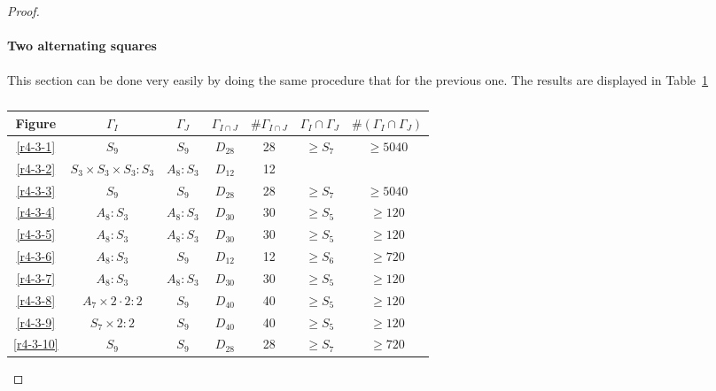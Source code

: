 \begin{proof}
  \paragraph{}
  \textbf{Two alternating squares}

  \paragraph{}
  This section can be done very easily by doing the same procedure that for the previous one. The results are displayed in Table~\ref{results-2-3}

  \begin{table}
    \centering
    \begin{tabular}{|c|c|c|c|c|c|c|}
      \hline
      Figure & $\Gamma_{I}$ & $\Gamma_{J}$ & $\Gamma_{I \cap J}$ & $\#\Gamma_{I \cap J}$ & $\Gamma_{I} \cap \Gamma_{J}$ & $\#(\Gamma_{I} \cap \Gamma_{J})$ \\ \hline

      \ref{r4-3-1} & $S_9$ & $S_9$ & $D_{28}$ & 28 & $\ge S_7$ & $\ge 5040$ \\ \hline
      \ref{r4-3-2} & $S_3 \times S_3 \times S_3:S_3$ & $A_8 : S_3$ & $D_{12}$ & 12 & & \\ \hline
      \ref{r4-3-3} & $S_9$ & $S_9$ & $D_{28}$ & 28 & $\ge S_7$ & $\ge 5040$ \\ \hline
      \ref{r4-3-4} & $A_8 : S_3$ & $A_8 : S_3$ & $D_{30}$ & 30 & $\ge S_5$ & $\ge 120$ \\ \hline
      \ref{r4-3-5} & $A_8 : S_3$ & $A_8 : S_3$ & $D_{30}$ & 30 & $\ge S_5$ & $\ge 120$ \\ \hline
      \ref{r4-3-6} & $A_8 : S_3$ & $S_9$ & $D_{12}$ & 12 & $\ge S_6$ & $\ge 720$ \\ \hline
      \ref{r4-3-7} & $A_8 : S_3$ & $A_8 : S_3$ & $D_{30}$ & 30 & $\ge S_5$ & $\ge 120$  \\ \hline
      \ref{r4-3-8} & $A_7 \times 2 \cdot 2 : 2$ & $S_9$ & $D_{40}$ & 40 & $\ge S_5$ & $\ge 120$ \\ \hline
      \ref{r4-3-9} & $S_7 \times 2:2$ & $S_9$ & $D_{40}$ & 40 & $\ge S_5$ & $\ge 120$ \\ \hline
      \ref{r4-3-10}& $S_9$ & $S_9$ & $D_{28}$ & 28 & $\ge S_7$ & $\ge 720$ \\ \hline

    \end{tabular}
    \caption{}
    \label{results-2-3}
  \end{table}

\end{proof}
